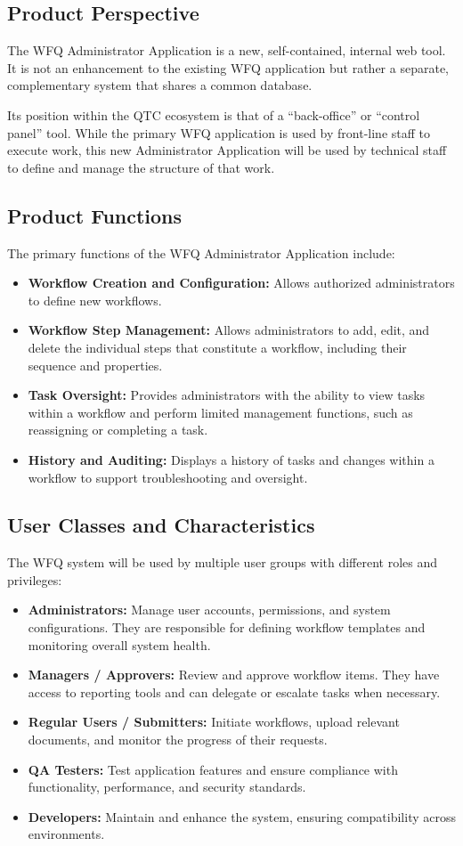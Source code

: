 \documentclass[12pt]{article}
\begin{document}
\subsection{Product Perspective}
The WFQ Administrator Application is a new, self-contained, internal web tool. It is not an
enhancement to the existing WFQ application but rather a separate, complementary system that
shares a common database.

Its position within the QTC ecosystem is that of a ``back-office'' or ``control panel'' tool.
While the primary WFQ application is used by front-line staff to execute work, this new
Administrator Application will be used by technical staff to define and manage the structure
of that work.

\subsection{Product Functions}
The primary functions of the WFQ Administrator Application include:
\begin{itemize}
    \item \textbf{Workflow Creation and Configuration:} Allows authorized administrators to
    define new workflows.
    \item \textbf{Workflow Step Management:} Allows administrators to add, edit, and delete
    the individual steps that constitute a workflow, including their sequence and properties.
    \item \textbf{Task Oversight:} Provides administrators with the ability to view tasks
    within a workflow and perform limited management functions, such as reassigning or
    completing a task.
    \item \textbf{History and Auditing:} Displays a history of tasks and changes within a
    workflow to support troubleshooting and oversight.
\end{itemize}

\subsection{User Classes and Characteristics}
The WFQ system will be used by multiple user groups with different roles and privileges:
\begin{itemize}
    \item \textbf{Administrators:} Manage user accounts, permissions, and system
    configurations. They are responsible for defining workflow templates and monitoring
    overall system health.
    \item \textbf{Managers / Approvers:} Review and approve workflow items. They have access
    to reporting tools and can delegate or escalate tasks when necessary.
    \item \textbf{Regular Users / Submitters:} Initiate workflows, upload relevant documents,
    and monitor the progress of their requests.
    \item \textbf{QA Testers:} Test application features and ensure compliance with
    functionality, performance, and security standards.
    \item \textbf{Developers:} Maintain and enhance the system, ensuring compatibility across
    environments.
\end{itemize}
\end{document}
